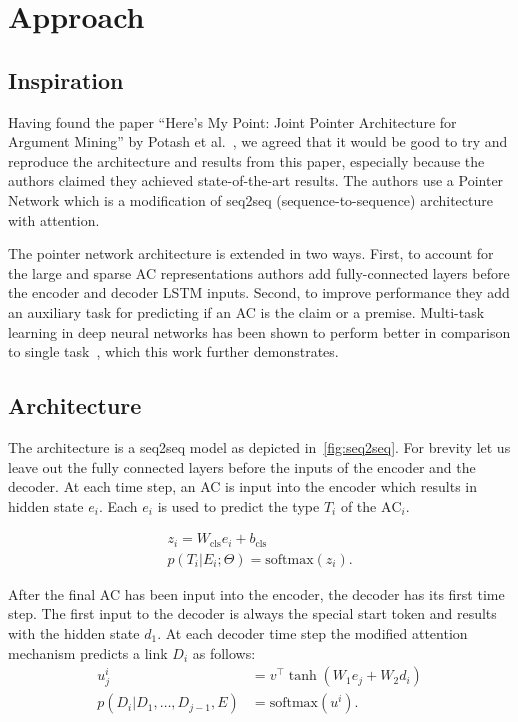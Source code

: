 \documentclass[onecolumn]{article}
\begin{document}
\section{Approach}
\subsection{Inspiration}
Having found the paper ``Here's My Point: Joint Pointer Architecture for Argument Mining'' by Potash et al.~\cite{potash2017here}, we agreed that it
would be good to try and reproduce the architecture and results from this paper, especially because the authors claimed they achieved
state-of-the-art results. The authors use a Pointer Network which is a modification of seq2seq (sequence-to-sequence) architecture with attention.

The pointer network architecture is extended in two ways.
First, to account for the large and sparse AC representations authors add fully-connected layers before the encoder and decoder LSTM inputs.
Second, to improve performance they add an auxiliary task for predicting if an AC is the claim or a premise.
Multi-task learning in deep neural networks has been shown to perform better in comparison to single task~\cite{multi}, which this work further demonstrates.

\subsection{Architecture}
The architecture is a seq2seq model as depicted in~\autoref{fig:seq2seq}.
For brevity let us leave out the fully connected layers before the inputs of the encoder and the decoder.
At each time step, an AC is input into the encoder which results in hidden state $e_i$.
Each $e_i$ is used to predict the type $T_i$ of the $\text{AC}_i$.

\begin{align*}
    z_i = W_{\text{cls}} e_i + b_{\text{cls}}\\
    p(T_i|E_i;\Theta) = \text{softmax}(z_i).
\end{align*}


After the final AC has been input into the encoder, the decoder has its first time step.
The first input to the decoder is always the special start token and results with the hidden state $d_1$.
At each decoder time step the modified attention mechanism predicts a link $D_i$ as follows:
\begin{align*}
    u_j^i &= v^\top \tanh(W_1e_j + W_2d_i)\\
    p(D_i|D_1,\dots,D_{j-1},E) &= \text{softmax}(u^i).
\end{align*}
\end{document}
